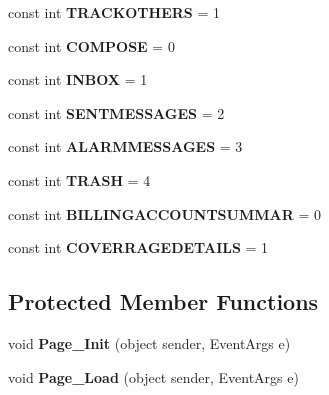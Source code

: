 \begin{DoxyCompactItemize}
\item 
\hypertarget{classsiteuser_ad0667582d13275c11e7b38234844a354}{const int {\bfseries T\-R\-A\-C\-K\-O\-T\-H\-E\-R\-S} = 1}\label{classsiteuser_ad0667582d13275c11e7b38234844a354}

\item 
\hypertarget{classsiteuser_a8f42529a801c3bc9c21887a227c90e9d}{const int {\bfseries C\-O\-M\-P\-O\-S\-E} = 0}\label{classsiteuser_a8f42529a801c3bc9c21887a227c90e9d}

\item 
\hypertarget{classsiteuser_a154491429ee566d5f910c65818109423}{const int {\bfseries I\-N\-B\-O\-X} = 1}\label{classsiteuser_a154491429ee566d5f910c65818109423}

\item 
\hypertarget{classsiteuser_ad477a77bb8418970f595596b3ae37c2c}{const int {\bfseries S\-E\-N\-T\-M\-E\-S\-S\-A\-G\-E\-S} = 2}\label{classsiteuser_ad477a77bb8418970f595596b3ae37c2c}

\item 
\hypertarget{classsiteuser_ab129b4c09b8cca0b8c9b28cb07748caf}{const int {\bfseries A\-L\-A\-R\-M\-M\-E\-S\-S\-A\-G\-E\-S} = 3}\label{classsiteuser_ab129b4c09b8cca0b8c9b28cb07748caf}

\item 
\hypertarget{classsiteuser_ae8231329416b314d69ad9918e52595f9}{const int {\bfseries T\-R\-A\-S\-H} = 4}\label{classsiteuser_ae8231329416b314d69ad9918e52595f9}

\item 
\hypertarget{classsiteuser_a9784e31d50b21e184774c8ca5aa09c2d}{const int {\bfseries B\-I\-L\-L\-I\-N\-G\-A\-C\-C\-O\-U\-N\-T\-S\-U\-M\-M\-A\-R} = 0}\label{classsiteuser_a9784e31d50b21e184774c8ca5aa09c2d}

\item 
\hypertarget{classsiteuser_a7ddfc011da7772e39d038eefcd62e85c}{const int {\bfseries C\-O\-V\-E\-R\-R\-A\-G\-E\-D\-E\-T\-A\-I\-L\-S} = 1}\label{classsiteuser_a7ddfc011da7772e39d038eefcd62e85c}

\end{DoxyCompactItemize}
\subsection*{Protected Member Functions}
\begin{DoxyCompactItemize}
\item 
\hypertarget{classsiteuser_abb11093e15d594ac1178269d753b2d24}{void {\bfseries Page\-\_\-\-Init} (object sender, Event\-Args e)}\label{classsiteuser_abb11093e15d594ac1178269d753b2d24}

\item 
\hypertarget{classsiteuser_aa41ca54631613bf74dad2583ff3ef205}{void {\bfseries Page\-\_\-\-Load} (object sender, Event\-Args e)}\label{classsiteuser_aa41ca54631613bf74dad2583ff3ef205}

\end{DoxyCompactItemize}


